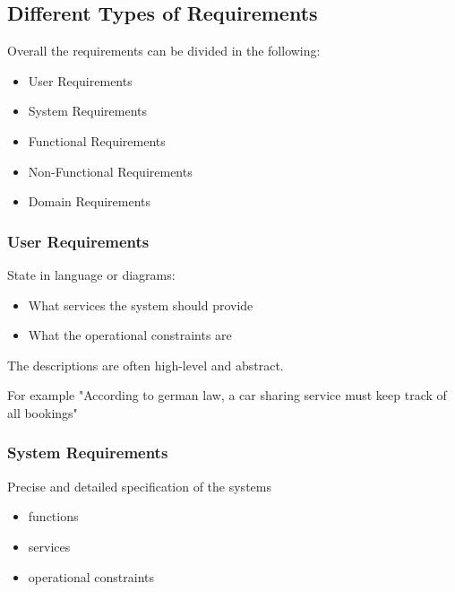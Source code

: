 \documentclass[
../../Software_Engineering_Summary.tex,
]
{subfiles}
\begin{document}
\subsection{Different Types of Requirements}
Overall the requirements can be divided in the following:

\begin{greenbox*}
    \begin{itemize}
        \item User Requirements
        \item System Requirements
        \item Functional Requirements
        \item Non-Functional Requirements
        \item Domain Requirements
    \end{itemize}
\end{greenbox*}

\subsubsection{User Requirements}

\begin{greenbox*}
    State in language or diagrams:
    \begin{itemize}
        \item What services the system should provide
        \item What the operational constraints are
    \end{itemize}
    The descriptions are often high-level and abstract.
\end{greenbox*}

For example "According to german law, a car sharing service must keep track of all bookings"

\subsubsection{System Requirements}

\begin{greenbox*}
    Precise and detailed specification of the systems
    \begin{itemize}
        \item functions
        \item services 
        \item operational constraints
    \end{itemize}
\end{greenbox*}
\end{document}
